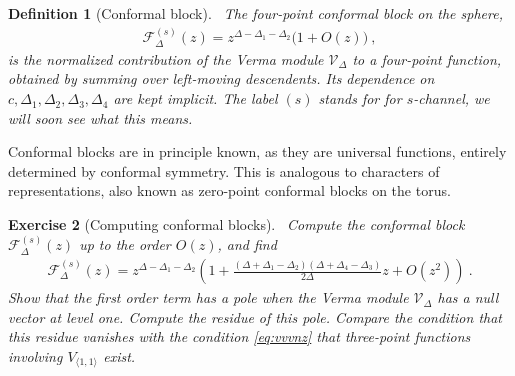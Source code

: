 \documentclass[12pt, a4paper]{article}
\theoremstyle{break}
\newtheorem{exo}{Exercise}[section]
\newtheorem{defn}[exo]{Definition}
\begin{document}
\begin{defn}[Conformal block]
 ~\label{def:block}
 The four-point conformal block on the sphere,
 \begin{align}
  \mathcal{F}^{(s)}_\Delta(z) = z^{\Delta-\Delta_1-\Delta_2}\Big( 1 + O(z) \Big)\ ,
  \label{eq:gsd}
 \end{align}
is the normalized contribution of the Verma module $\mathcal V_\Delta$ to a four-point function, obtained by summing over left-moving descendents. Its dependence on $c,\Delta_1,\Delta_2,\Delta_3,\Delta_4$ are kept implicit. The label $(s)$ stands for for $s$-channel, we will soon see what this means.
\end{defn}
Conformal blocks are in principle known, as they are universal functions, entirely determined by conformal symmetry. This is analogous to characters of representations, also known as zero-point conformal blocks on the torus.

\begin{exo}[Computing conformal blocks]
 ~\label{exo:block}
 Compute the conformal block $ \mathcal{F}^{(s)}_\Delta(z)$ up to the order $O(z)$, and find
 \begin{align}
  \mathcal{F}^{(s)}_\Delta(z) = z^{\Delta-\Delta_1-\Delta_2}\left( 1 + \frac{(\Delta+\Delta_1-\Delta_2)(\Delta+\Delta_4-\Delta_3)}{2\Delta}z + O(z^2) \right)\ .
 \end{align}
 Show that the first order term has a pole when the Verma module $\mathcal{V}_\Delta$ has a null vector at level one.
 Compute the residue of this pole. Compare the condition that this residue vanishes with the condition \eqref{eq:vvvnz} that three-point functions involving $V_{\langle 1,1\rangle}$ exist.
\end{exo}
\end{document}
